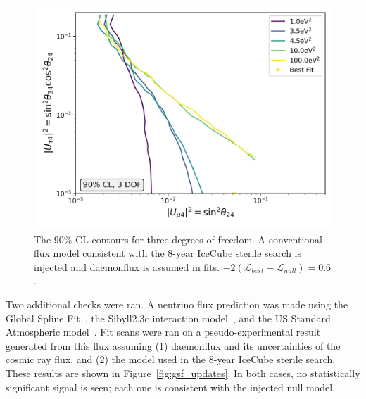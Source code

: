 \documentclass[main.tex]{subfiles}
\begin{document}
\begin{figure}  
    \centering
    \includegraphics[width=0.7\linewidth]{figures/joint_daemon_inject_barr_Realization_Asimov_sterile_0_cl0.9_dof3.png}
    \caption{The 90\% CL contours for three degrees of freedom. A conventional flux model consistent with the 8-year IceCube sterile search is injected and daemonflux is assumed in fits. $-2(\mathcal{L}_{best}-\mathcal{L}_{null})=0.6$.}\label{fig:daemon_midmodel}
\end{figure}

Two additional checks were ran. 
A neutrino flux prediction was made using the Global Spline Fit~\cite{dembinski2017datadriven}, the Sibyll2.3c interaction model~\cite{Riehn:2017mfm}, and the US Standard Atmospheric model~\cite{united1976u}. 
Fit scans were ran on a pseudo-experimental result generated from this flux assuming (1) daemonflux and its uncertainties of the cosmic ray flux, and (2) the model used in the 8-year IceCube sterile search. 
These results are shown in Figure~\ref{fig:gsf_updates}. 
In both cases, no statistically significant signal is seen; each one is consistent with the injected null model. 
\end{document}
